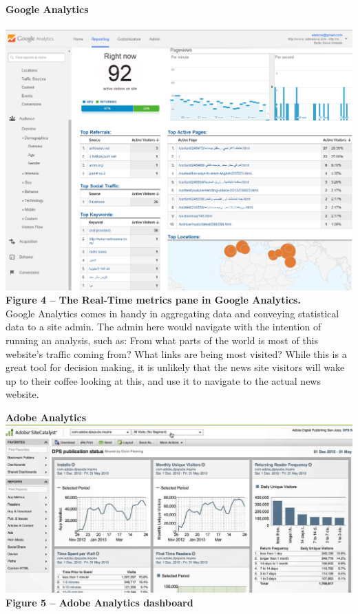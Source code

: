 \documentclass[12pt]{article}
\begin{document}
\noindent\textbf{Google Analytics} \\ \\
\noindent\includegraphics[scale=0.4]{img/google_analytics} \\
\noindent\textbf{Figure 4 -- The Real-Time metrics pane in Google Analytics.} \\

Google Analytics comes in handy in aggregating data and conveying statistical data to a site admin. The admin here would navigate with the intention of running an analysis, such as: From what parts of the world is most of this website's traffic coming from? What links are being most visited?
While this is a great tool for decision making, it is unlikely that the news site visitors will wake up to their coffee looking at this, and use it to navigate to the actual news website. \\

\newpage

\noindent\textbf{Adobe Analytics} \\

\noindent\includegraphics[scale=0.5]{img/adobe} \\
\noindent\textbf{Figure 5 -- Adobe Analytics dashboard} \\
\end{document}

